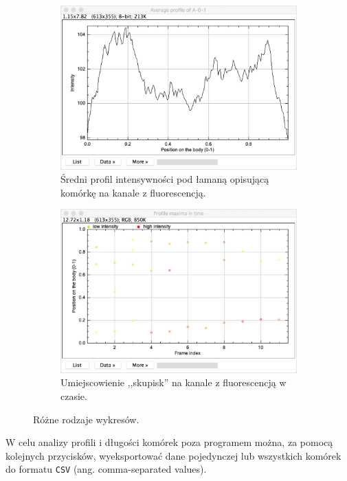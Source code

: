 \documentclass[declaration,shortabstract,mgr]{iithesis}
\begin{document}
\begin{figure}
  \begin{subfigure}[t]{.45\textwidth}
    \centering
    \includegraphics[width=\textwidth]{images/ui-plot-avg-profile.png}
    \caption{\centering Średni profil intensywności pod łamaną opisującą komórkę na kanale z fluorescencją.}
  \end{subfigure}
  \hfill
  \begin{subfigure}[t]{.45\textwidth}
    \centering
    \includegraphics[width=\textwidth]{images/ui-plot-picks.png}
    \caption{\centering Umiejscowienie ,,skupisk'' na kanale z fluorescencją w czasie.}
  \end{subfigure}
  \hfill

  \caption{Różne rodzaje wykresów.}
  \label{fig:ui-plots}
\end{figure}

W celu analizy profili i długości komórek poza programem można, za pomocą kolejnych przycisków, wyeksportować dane pojedynczej lub wszystkich komórek do formatu \texttt{CSV} (ang. comma-separated values).
\end{document}
